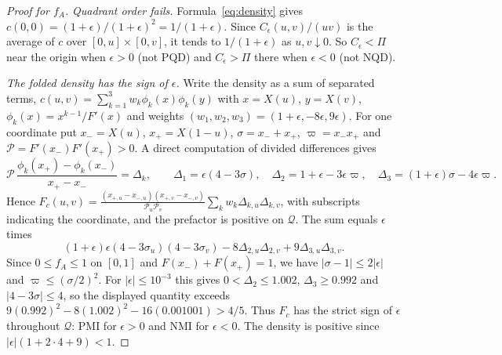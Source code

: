 \documentclass[11pt,a4paper]{article}
\theoremstyle{remark}
\newcommand{\Qq}{\mathcal Q}
\begin{document}
\begin{proof}[Proof for $f_A$]
\emph{Quadrant order fails.} Formula~\eqref{eq:density} gives $c(0,0)=(1+\epsilon)/(1+\epsilon)^2=1/(1+\epsilon)$. Since $C_\epsilon(u,v)/(uv)$ is the average of $c$ over $[0,u]\times[0,v]$, it tends to $1/(1+\epsilon)$ as $u,v\downarrow0$. So $C_\epsilon<\Pi$ near the origin when $\epsilon>0$ (not PQD) and $C_\epsilon>\Pi$ there when $\epsilon<0$ (not NQD).

\emph{The folded density has the sign of $\epsilon$.} Write the density as a sum of separated terms, $c(u,v)=\sum_{k=1}^3w_k\phi_k(x)\phi_k(y)$ with $x=X(u)$, $y=X(v)$, $\phi_k(x)=x^{k-1}/F'(x)$ and weights $(w_1,w_2,w_3)=(1+\epsilon,-8\epsilon,9\epsilon)$. For one coordinate put $x_-=X(u)$, $x_+=X(1-u)$, $\sigma=x_-+x_+$, $\varpi=x_-x_+$ and $\mathcal P=F'(x_-)F'(x_+)>0$. A direct computation of divided differences gives
\[
 \mathcal P\,\frac{\phi_k(x_+)-\phi_k(x_-)}{x_+-x_-}=\Delta_k,\qquad \Delta_1=\epsilon(4-3\sigma),\quad \Delta_2=1+\epsilon-3\epsilon\varpi,\quad \Delta_3=(1+\epsilon)\sigma-4\epsilon\varpi .
\]
Hence $F_c(u,v)=\frac{(x_{+,u}-x_{-,u})(x_{+,v}-x_{-,v})}{\mathcal P_u\mathcal P_v}\sum_kw_k\Delta_{k,u}\Delta_{k,v}$, with subscripts indicating the coordinate, and the prefactor is positive on $\Qq$. The sum equals $\epsilon$ times
\[
 (1+\epsilon)\epsilon(4-3\sigma_u)(4-3\sigma_v)-8\Delta_{2,u}\Delta_{2,v}+9\Delta_{3,u}\Delta_{3,v}.
\]
Since $0\leq f_A\leq1$ on $[0,1]$ and $F(x_-)+F(x_+)=1$, we have $|\sigma-1|\leq2|\epsilon|$ and $\varpi\leq(\sigma/2)^2$. For $|\epsilon|\leq10^{-3}$ this gives $0<\Delta_2\leq1.002$, $\Delta_3\geq0.992$ and $|4-3\sigma|\leq4$, so the displayed quantity exceeds $9(0.992)^2-8(1.002)^2-16(0.001001)>4/5$. Thus $F_c$ has the strict sign of $\epsilon$ throughout $\Qq$: PMI for $\epsilon>0$ and NMI for $\epsilon<0$. The density is positive since $|\epsilon|(1+2\cdot4+9)<1$.
\end{proof}
\end{document}

